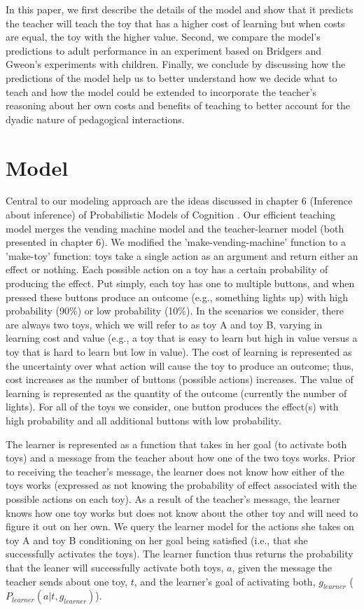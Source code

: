 \documentclass[10pt,letterpaper]{article}
\begin{document}
In this paper, we first describe the details of the model and show that it predicts the teacher will teach the toy that has a higher cost of learning but when costs are equal, the toy with the higher value. Second, we compare the model's predictions to adult performance in an experiment based on Bridgers and Gweon's experiments with children. Finally, we conclude by discussing how the predictions of the model help us to better understand how we decide what to teach and how the model could be extended to incorporate the teacher's reasoning about her own costs and benefits of teaching to better account for the dyadic nature of pedagogical interactions.

\section{Model}

Central to our modeling approach are the ideas discussed in chapter 6 (Inference about inference) of Probabilistic Models of Cognition \cite{Goodman}. Our efficient teaching model merges the vending machine model and the teacher-learner model (both presented in chapter 6).  We modified the 'make-vending-machine' function to a 'make-toy' function: toys take a single action as an argument and return either an effect or nothing. Each possible action on a toy has a certain probability of producing the effect. Put simply, each toy has one to multiple buttons, and when pressed these buttons produce an outcome (e.g., something lights up) with high probability (90\%) or low probability (10\%). In the scenarios we consider, there are always two toys, which we will refer to as toy A and toy B, varying in learning cost and value (e.g., a toy that is easy to learn but high in value versus a toy that is hard to learn but low in value). The cost of learning is represented as the uncertainty over what action will cause the toy to produce an outcome; thus, cost increases as the number of buttons (possible actions) increases. The value of learning is represented as the quantity of the outcome (currently the number of lights). For all of the toys we consider, one button produces the effect(s) with high probability and all additional buttons with low probability.

The learner is represented as a function that takes in her goal (to activate both toys) and a message from the teacher about how one of the two toys works. Prior to receiving the teacher's message, the learner does not know how either of the toys works (expressed as not knowing the probability of effect associated with the possible actions on each toy).  As a result of the teacher's message, the learner knows how one toy works but does not know about the other toy and will need to figure it out on her own. We query the learner model for the actions she takes on toy A and toy B conditioning on her goal being satisfied (i.e., that she successfully activates the toys). The learner function thus returns the probability that the leaner will successfully activate both toys, $a$, given the message the teacher sends about one toy, $t$, and the learner's goal of activating both, $g_{learner}$ ($P_{learner}(a | t, g_{learner})$). 
\end{document}
